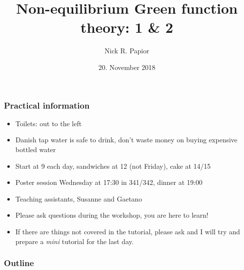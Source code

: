 


\graphicspath{{fig/}}
\usepackage[export]{adjustbox}


\date{20. November 2018}
\title{Non-equilibrium Green function theory: 1 \& 2}
\author{Nick R. Papior}




\begin{frame}
  \titlepage
\end{frame}

\begin{frame}
  \frametitle{Practical information}

  \small
  \begin{itemize}[<+->]
    
    \item Toilets: out to the left

    \item Danish tap water is safe to drink, don't waste money on buying expensive bottled
    water

    \item Start at 9 each day, sandwiches at 12 (not Friday), cake at 14/15

    \item Poster session Wednesday at 17:30 in 341/342, dinner at 19:00

    \item Teaching assistants, Susanne and Gaetano

    \item Please ask questions during the workshop, you are here to learn!

    \item If there are things not covered in the tutorial, please ask and I will try and
    prepare a \emph{mini} tutorial for the last day.

  \end{itemize}
  
\end{frame}

\begin{frame}
  \frametitle{Outline}
  \tableofcontents
\end{frame}










